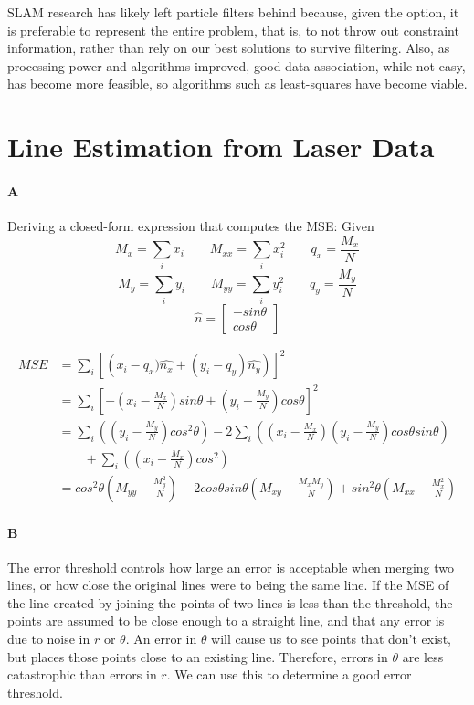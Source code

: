 \documentclass[12pt]{article}
\begin{document}
SLAM research has likely left particle filters behind because, given the option,
it is preferable to represent the entire problem, that is, to not throw out
constraint information, rather than rely on our best solutions to survive
filtering. Also, as processing power and algorithms improved, good data association,
while not easy, has become more feasible, so algorithms such as least-squares
have become viable.

\section{Line Estimation from Laser Data}

\paragraph{A}Deriving a closed-form expression that computes the MSE:
Given
$$M_x = \displaystyle\sum_i x_i \qquad M_{xx} = \displaystyle\sum_i x_i^2 \qquad q_x = \frac{M_x}{N}$$
$$M_y = \displaystyle\sum_i y_i \qquad M_{yy} = \displaystyle\sum_i y_i^2 \qquad q_y = \frac{M_y}{N}$$
 $$\hat{n} = \left[ \begin{array}{c}
-sin\theta \\
cos\theta
\end{array}\right]$$

\begin{align*} MSE &=  \displaystyle\sum_i \left[\left(x_i - q_x)\hat{n_x} + (y_i - q_y)\hat{n_y}\right)\right]^2\\
&=\displaystyle\sum_i \left[-\left(x_i - \frac{M_x}{N}\right)sin\theta + \left(y_i - \frac{M_y}{N}\right)cos\theta\right]^2 \\
&=\displaystyle\sum_i \left(\left(y_i - \frac{M_y}{N}\right)cos^2\theta \right)
-2\displaystyle\sum_i \left(\left(x_i-\frac{M_x}{N}\right)\left(y_i - \frac{M_y}{N}\right)cos\theta sin\theta\right) \\
 &\qquad+ \displaystyle\sum_i \left(\left(x_i - \frac{M_x}{N}\right)cos^2\right) \\
&= cos^2\theta(M_{yy}-\frac{M_y^2}{N}) - 2cos\theta sin\theta(M_{xy}-\frac{M_xM_y}{N}) + sin^2\theta(M_{xx}-\frac{M_x^2}{N})
\end{align*}

\paragraph{B}
The error threshold controls how large an error is acceptable when merging
two lines, or how close the original lines were to being the same line.  If the
MSE of the line created by joining the points of two lines is less than the threshold,
the points are assumed to be close enough to a straight line, and that any error
is due to noise in $r$ or $\theta$.  An error in $\theta$ will cause us to see points
that don't exist, but places those points close to an existing line.  Therefore, errors in
$\theta$ are less catastrophic than errors in $r$.  We can use this to determine
a good error threshold.
\end{document}
